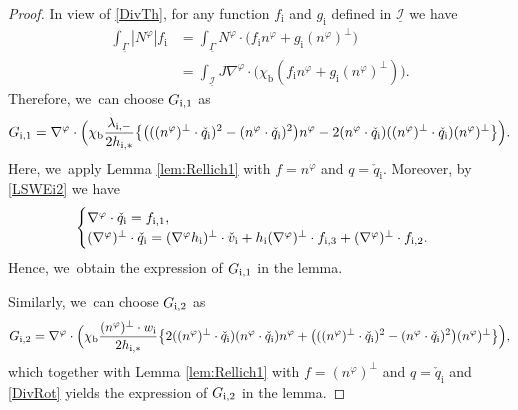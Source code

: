 \documentclass[10pt]{amsart}
\newcommand{\cI}{{\mathcal I}}
\newcommand{\ul}[1]{\underline{#1}}
\newcommand{\itGamma}{\mathit{\Gamma}}
\theoremstyle{definition}
\begin{document}
\begin{proof}
In view of \eqref{DivTh}, for any function $f_\mathrm{i}$ and $g_\mathrm{i}$ defined in $\ul{\cI}$ we have
\begin{align*}
\int_{\ul{\itGamma}}|N^\varphi|f_\mathrm{i}
&= \int_{\ul{\itGamma}}N^\varphi\cdot\bigl(f_\mathrm{i}n^\varphi + g_\mathrm{i}(n^\varphi)^\perp\bigr) \\
&= \int_{\ul{\cI}}J\nabla^\varphi\cdot\bigl(\chi_\mathrm{b}(f_\mathrm{i}n^\varphi + g_\mathrm{i}(n^\varphi)^\perp) \bigr).
\end{align*}
Therefore, we~can choose $G_{{\rm i},1}$ as
\[
G_{{\rm i},1} = \nabla^\varphi\cdot\Bigl(\chi_\mathrm{b}\frac{\lambda_{{\rm i},-}}{2h_{{\rm i},*}}\bigl\{
\bigl(((n^\varphi)^\perp\cdot\check{q}_\mathrm{i})^2 - (n^\varphi\cdot\check{q}_\mathrm{i})^2 \bigr)n^\varphi
- 2(n^\varphi\cdot\check{q}_\mathrm{i})((n^\varphi)^\perp\cdot\check{q}_\mathrm{i}) (n^\varphi)^\perp \bigr\} \Bigr).
\]
Here, we~apply Lemma \ref{lem:Rellich1} with $f=n^\varphi$ and $q=\check{q}_\mathrm{i}$.
Moreover, by \eqref{LSWEi2} we have
\begin{equation}\label{DivRot}
\begin{cases}
\nabla^\varphi\cdot\check{q}_\mathrm{i}=f_{{\rm i},1}, \\
(\nabla^\varphi)^\perp\cdot\check{q}_\mathrm{i}
=(\nabla^\varphi h_\mathrm{i})^\perp\cdot\check{v}_\mathrm{i} + h_\mathrm{i}(\nabla^\varphi)^\perp\cdot f_{{\rm i},3} + (\nabla^\varphi)^\perp\cdot f_{{\rm i},2}.
\end{cases}
\end{equation}
Hence, we~obtain the expression of $G_{{\rm i},1}$ in the lemma.

Similarly, we~can choose $G_{{\rm i},2}$ as
\[
G_{{\rm i},2 } = \nabla^\varphi\cdot\Bigl(\chi_\mathrm{b}\frac{(n^\varphi)^\perp\cdot w_\mathrm{i}}{2h_{{\rm i},*}}\bigl\{
2((n^\varphi)^\perp\cdot\check{q}_\mathrm{i})(n^\varphi\cdot\check{q}_\mathrm{i}) n^\varphi
+ \bigl(((n^\varphi)^\perp\cdot\check{q}_\mathrm{i})^2 - (n^\varphi\cdot\check{q}_\mathrm{i})^2 \bigr) (n^\varphi)^\perp \bigr\} \Bigr),
\]
which together with Lemma \ref{lem:Rellich1} with $f=(n^\varphi)^\perp$ and $q=\check{q}_\mathrm{i}$
and \eqref{DivRot} yields the expression of $G_{{\rm i},2}$ in the lemma.


\end{proof}
\end{document}
